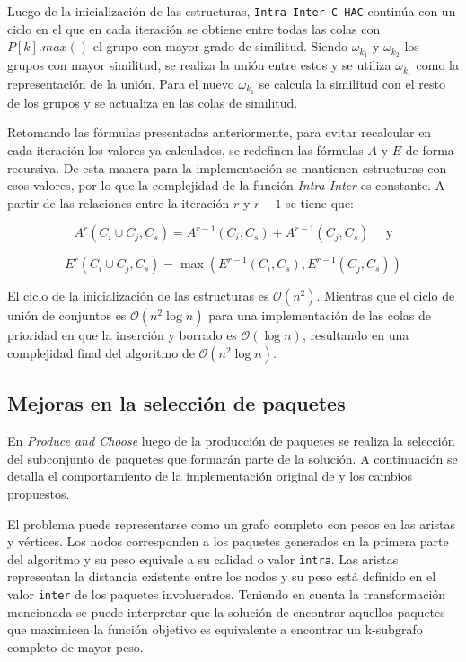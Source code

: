 Luego de la inicialización de las estructuras, \texttt{Intra-Inter C-HAC} continúa con un ciclo en el que en cada iteración se obtiene entre todas las colas con $P\left[k\right].max()$ el grupo con mayor grado de similitud. Siendo $\omega_{k_{1}}$ y $\omega_{k_{2}}$ los grupos con mayor similitud, se realiza la unión entre estos y se utiliza $\omega_{k_{1}}$  como la representación de la unión. Para el nuevo  $\omega_{k_{1}}$ se calcula la similitud con el resto de los grupos y se actualiza en las colas de similitud.

Retomando las fórmulas presentadas anteriormente, para evitar recalcular en cada iteración los valores ya calculados, se redefinen las fórmulas $A$ y $E$ de forma recursiva. De esta manera para la implementación se mantienen estructuras con esos valores, por lo que la complejidad de la función \textit{Intra-Inter} es constante. A partir de las relaciones entre la iteración $r$ y $r-1$ se tiene que:

$$A^r(C_i \cup C_j, C_s) = A^{r-1}(C_i,C_s) + A^{r-1}(C_j,C_s) \quad \mbox{ y}$$

$$E^r(C_i \cup C_j,C_s) = \max (E^{r-1}(C_i,C_s),E^{r-1}(C_j,C_s))$$

El ciclo de la inicialización de las estructuras es $\mathcal{O}(n^{2})$. Mientras que el ciclo de unión de conjuntos es $\mathcal{O}(n^{2}\log n)$ para una implementación de las colas de prioridad en que la inserción y borrado es $\mathcal{O}(\log n)$, resultando en una complejidad final del algoritmo de $\mathcal{O}(n^{2}\log n)$.

\subsection{Mejoras en la selección de paquetes}
En \emph{Produce and Choose} luego de la producción de paquetes se realiza la selección del subconjunto de paquetes que formarán parte de la solución. A continuación se detalla el comportamiento de la implementación original de \cite{journals/tkde/Amer-YahiaBCFMZ14} y los cambios propuestos.

El problema puede representarse como un grafo completo con pesos en las aristas y vértices. Los nodos corresponden a los paquetes generados en la primera parte del algoritmo y su peso equivale a su calidad o valor \texttt{intra}. Las aristas representan la distancia existente entre los nodos y su peso está definido en el valor \texttt{inter} de los paquetes involucrados. Teniendo en cuenta la transformación mencionada se puede interpretar que la solución de encontrar aquellos paquetes que maximicen la función objetivo es equivalente a encontrar un k-subgrafo completo de mayor peso.

